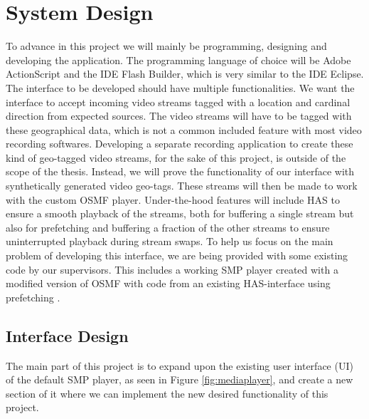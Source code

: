 \chapter{System Design}
\label{cha:sysdesign}

To advance in this project we will mainly be programming, designing and developing the application. The programming language of choice will be Adobe ActionScript and the IDE Flash Builder, which is very similar to the IDE Eclipse. The interface to be developed should have multiple functionalities. We want the interface to accept incoming video streams tagged with a location and cardinal direction from expected sources. The video streams will have to be tagged with these geographical data, which is not a common included feature with most video recording softwares. Developing a separate recording application to create these kind of geo-tagged video streams, for the sake of this project, is outside of the scope of the thesis. Instead, we will prove the functionality of our interface with synthetically generated video geo-tags. These streams will then be made to work with the custom OSMF player.  Under-the-hood features will include HAS to ensure a smooth playback of the streams, both for buffering a single stream but also for prefetching and buffering a fraction of the other streams to ensure uninterrupted playback during stream swaps. To help us focus on the main problem of developing this interface, we are being provided with some existing code by our supervisors. This includes a working SMP player created with a modified version of OSMF with code from an existing HAS-interface using prefetching \cite{qualbranch}.

\section{Interface Design}
\label{sec:interfacedesign}

The main part of this project is to expand upon the existing user interface (UI) of the default SMP player, as seen in Figure \ref{fig:mediaplayer}, and create a new section of it where we can implement the new desired functionality of this project. 


